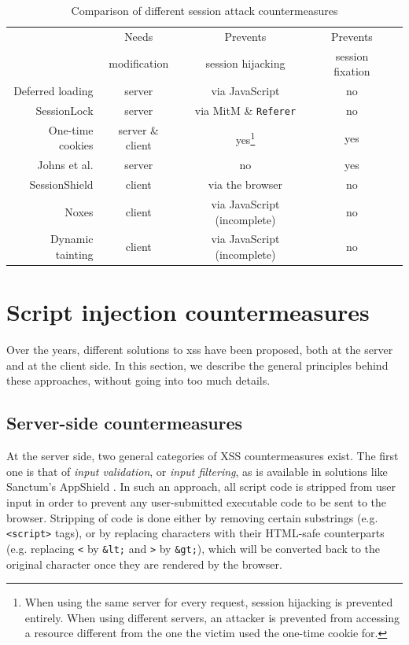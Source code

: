 \begin{table}[htbp]
	\centering
	\begin{minipage}{\textwidth}
	\begin{tabular}{r|cccc}
		& Needs & Prevents & Prevents\\
		& modification & session hijacking & session fixation\\
		\hline
		Deferred loading & server & via JavaScript & no\\
		SessionLock & server & via MitM \& \texttt{Referer} & no\\
		One-time cookies & server \& client & yes\footnote{When using the same server for every request, session hijacking is prevented entirely. When using different servers, an attacker is prevented from accessing a resource different from the one the victim used the one-time cookie for.} & yes\\
		Johns et al. & server & no & yes\\
		SessionShield & client & via the browser & no\\
		Noxes & client & via JavaScript (incomplete) & no\\
		Dynamic tainting & client & via JavaScript (incomplete) & no\\
	\end{tabular}
	\end{minipage}
	\caption{Comparison of different session attack countermeasures}
	\label{tab:countermeasures}
\end{table}

\section{Script injection countermeasures}\label{xss-countermeasures}

Over the years, different solutions to \gls{xss} have been proposed, both at the server and at the client side. In this section, we describe the general principles behind these approaches, without going into too much details.

\subsection{Server-side countermeasures}

At the server side, two general categories of XSS countermeasures exist. The first one is that of \emph{input validation}, or \emph{input filtering}, as is available in solutions like Sanctum's AppShield \cite{Klein2002}. In such an approach, all script code is stripped from user input in order to prevent any user-submitted executable code to be sent to the browser. Stripping of code is done either by removing certain substrings (e.g. \texttt{<script>} tags), or by replacing characters with their HTML-safe counterparts (e.g. replacing \texttt{<} by \texttt{\&lt;} and \texttt{>} by \texttt{\&gt;}), which will be converted back to the original character once they are rendered by the browser.

